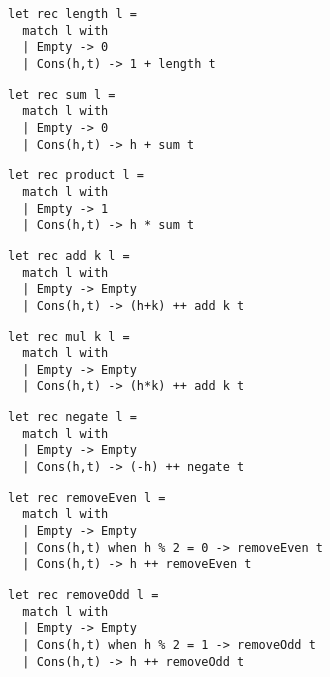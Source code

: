 \documentclass{beamer}
\begin{document}
\begin{frame}[fragile]
\begin{lstlisting}
let rec length l =
  match l with
  | Empty -> 0
  | Cons(h,t) -> 1 + length t
\end{lstlisting}
\end{frame}

\begin{frame}[fragile]
\begin{lstlisting}
let rec sum l =
  match l with
  | Empty -> 0
  | Cons(h,t) -> h + sum t
\end{lstlisting}
\end{frame}

\begin{frame}[fragile]
\begin{lstlisting}
let rec product l =
  match l with
  | Empty -> 1
  | Cons(h,t) -> h * sum t
\end{lstlisting}
\end{frame}

\begin{frame}[fragile]
\begin{lstlisting}
let rec add k l =
  match l with
  | Empty -> Empty
  | Cons(h,t) -> (h+k) ++ add k t
\end{lstlisting}
\end{frame}

\begin{frame}[fragile]
\begin{lstlisting}
let rec mul k l =
  match l with
  | Empty -> Empty
  | Cons(h,t) -> (h*k) ++ add k t
\end{lstlisting}
\end{frame}

\begin{frame}[fragile]
\begin{lstlisting}
let rec negate l =
  match l with
  | Empty -> Empty
  | Cons(h,t) -> (-h) ++ negate t
\end{lstlisting}
\end{frame}

\begin{frame}[fragile]
\begin{lstlisting}
let rec removeEven l =
  match l with
  | Empty -> Empty
  | Cons(h,t) when h % 2 = 0 -> removeEven t
  | Cons(h,t) -> h ++ removeEven t
\end{lstlisting}
\end{frame}

\begin{frame}[fragile]
\begin{lstlisting}
let rec removeOdd l =
  match l with
  | Empty -> Empty
  | Cons(h,t) when h % 2 = 1 -> removeOdd t
  | Cons(h,t) -> h ++ removeOdd t
\end{lstlisting}
\end{frame}
\end{document}
